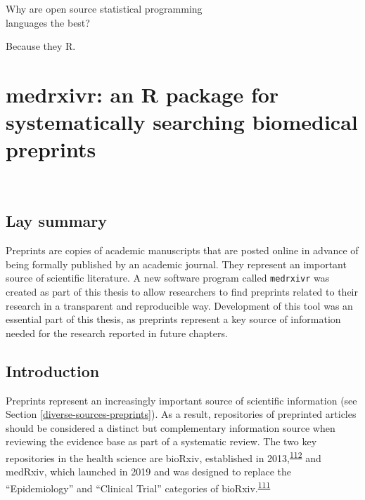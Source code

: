 \documentclass[a4paper, twoside]{templates/ociamthesis}
\begin{document}
\begin{savequote}
Why are open source statistical programming\\
languages the best?

Because they R.
\end{savequote}



\hypertarget{sys-rev-tools-heading}{%
\chapter{medrxivr: an R package for systematically searching biomedical preprints}\label{sys-rev-tools-heading}}

~

\minitoc 

\newpage

\begin{laybox}

\hypertarget{lay-summary-1}{%
\section*{Lay summary}\label{lay-summary-1}}

Preprints are copies of academic manuscripts that are posted online in advance of being formally published by an academic journal. They represent an important source of scientific literature. A new software program called \texttt{medrxivr} was created as part of this thesis to allow researchers to find preprints related to their research in a transparent and reproducible way. Development of this tool was an essential part of this thesis, as preprints represent a key source of information needed for the research reported in future chapters.

\end{laybox}

\hypertarget{sys-rev-tools-intro}{%
\section{Introduction}\label{sys-rev-tools-intro}}

Preprints represent an increasingly important source of scientific information (see Section \ref{diverse-sources-preprints}). As a result, repositories of preprinted articles should be considered a distinct but complementary information source when reviewing the evidence base as part of a systematic review. The two key repositories in the health science are bioRxiv, established in 2013,\textsuperscript{\protect\hyperlink{ref-sever2019}{112}} and medRxiv, which launched in 2019 and was designed to replace the ``Epidemiology'' and ``Clinical Trial'' categories of bioRxiv.\textsuperscript{\protect\hyperlink{ref-rawlinson2019}{111}}
\end{document}
